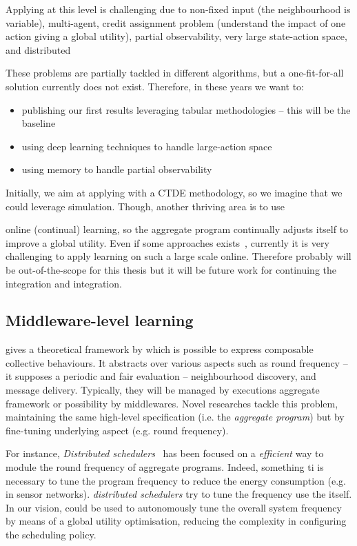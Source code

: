 \documentclass[11pt]{article}
\begin{document}
Applying \rl{} at this level is challenging due to non-fixed input (the neighbourhood is variable), multi-agent, credit assignment problem (understand the impact of one action giving a global utility), partial observability, very large state-action space, and distributed

These problems are partially tackled in different \marl{} algorithms, but a one-fit-for-all solution currently does not exist. Therefore, in these years we want to:
\begin{itemize}
	\item publishing our first results leveraging tabular methodologies -- this will be the baseline
	\item using deep learning techniques to handle large-action space
	\item using memory to handle partial observability
\end{itemize}
Initially, we aim at applying \rl{} with a CTDE methodology, so we imagine that we could leverage simulation.
Though, another thriving area is to use \item{online} (continual) learning, so the aggregate program continually adjusts itself to improve a global utility. Even if some approaches exists~\cite{DBLP:conf/icml/OmidshafieiPAHV17}, currently it is very challenging to apply learning on such a large scale online. Therefore probably will be out-of-the-scope for this thesis but it will be future work for continuing the integration \ac{} and \rl{} integration. 
\subsection{Middleware-level learning}
\ac{} gives a theoretical framework by which is possible to express composable collective behaviours. It abstracts over various aspects such as round frequency -- it supposes a periodic and fair evaluation -- neighbourhood discovery, and message delivery.
Typically, they will be managed by executions aggregate framework or possibility by \ac{} middlewares.
Novel researches tackle this problem, maintaining the same high-level specification (i.e. the \emph{aggregate program}) but by fine-tuning underlying aspect (e.g. round frequency).

For instance, \emph{Distributed schedulers}~\cite{DBLP:journals/corr/abs-2012-13806} has been focused on a \emph{efficient} way to module the round frequency of aggregate programs. Indeed, something ti is necessary to tune the program frequency to reduce the energy consumption (e.g. in sensor networks). \emph{distributed schedulers} try to tune the frequency use the \ac{} itself.
In our vision, \rl{} could be used to autonomously tune the overall system frequency by means of a global utility optimisation, reducing the complexity in configuring the scheduling policy.
\end{document}

